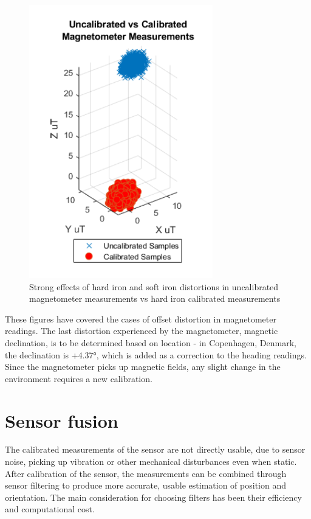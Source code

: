\begin{figure}[H]
 \centering
 \includegraphics{graphics/magoff.png}
  \caption{Strong effects of hard iron and soft iron distortions in uncalibrated magnetometer measurements vs hard iron calibrated measurements}
  \label{fig:mag__very_uncalibrated}
\end{figure}

These figures have covered the cases of offset distortion in magnetometer readings. The last distortion experienced by the magnetometer, magnetic declination, is to be determined based on location - in Copenhagen, Denmark, the declination is +4.37°, which is added as a correction to the heading readings. Since the magnetometer picks up magnetic fields, any slight change in the environment requires a new calibration. 

 \section{Sensor fusion}
 
 The calibrated measurements of the sensor are not directly usable, due to sensor noise, picking up vibration or other mechanical disturbances even when static. \cite{patonis2018fusion}
 After calibration of the sensor, the measurements can be combined through sensor filtering to produce more accurate, usable estimation of position and orientation. The main consideration for choosing filters has been their efficiency and computational cost.  
 
